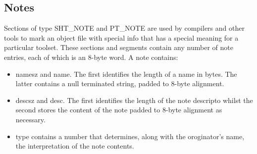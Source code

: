 \subsection{Notes}
Sections of type {\ttfamily SHT\_NOTE} and {\ttfamily PT\_NOTE} are used by compilers and other tools to mark an object file with special info that has a special meaning for a particular toolset. These sections and segments contain any number of note entries, each of which is an 8-byte word. A note contains:
\begin{itemize}
    \item {\ttfamily namesz} and {\ttfamily name}. The first identifies the length of a name in bytes. The latter contains a null terminated string, padded to 8-byte alignment.  
    \item {\ttfamily descsz} and {\ttfamily desc}. The first identifies the length of the note descripto whilst the second stores the content of the note padded to 8-byte alignment as necessary.
    \item {\ttfamily type} contains a number that determines, along with the oroginator's name, the interpretation of the note contents.
\end{itemize}

